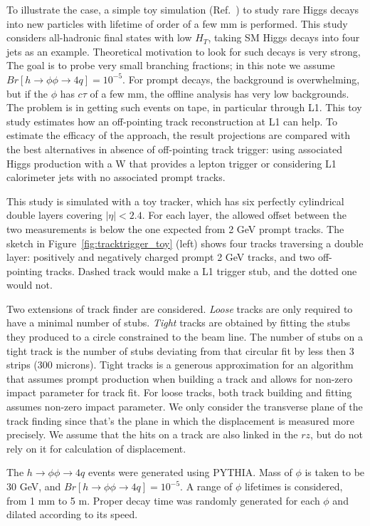To illustrate the case, a simple toy simulation (Ref.~\cite{Gershtein:2017tsv}) to study rare Higgs decays into new particles with lifetime of order of a few mm is performed. 
This study considers all-hadronic final states with low $H_T$, taking SM Higgs decays into four jets as an example.
Theoretical motivation to look for such decays is very strong, The goal is to probe very small
branching fractions; in this note we assume $Br[h\rightarrow\phi\phi\rightarrow 4q] = 10^{-5}$. 
For prompt decays, the background is overwhelming, but if the $\phi$ has $c\tau$ of a few mm, the offline analysis has very low 
backgrounds.
The problem is in getting such events on tape, in particular through L1. This toy study estimates how an off-pointing track reconstruction 
at L1 can help. To estimate the efficacy of the approach, the result projections are compared with the best alternatives in absence of off-pointing track trigger: using
associated Higgs production with a W that provides a lepton trigger or considering L1 calorimeter jets with no associated 
prompt tracks.

This study is simulated with a toy tracker, which has six perfectly cylindrical double layers \cite{geom} covering $|\eta|<2.4$. 
For each layer, the allowed offset between the two measurements
is below the one expected from 2 GeV prompt tracks. 
The sketch in Figure~\ref{fig:tracktrigger_toy} (left) shows four tracks traversing a double layer: positively and negatively charged 
prompt 2 GeV tracks, and two off-pointing tracks. Dashed track would make a L1 trigger stub, and the dotted one would not. 

Two extensions of track finder are considered. {\it Loose} tracks are only required to have a minimal number of stubs. 
{\it Tight} tracks are obtained by fitting the stubs they produced to a circle constrained to the beam line. The number of stubs on a tight track
is the number of stubs deviating from that circular fit by less then 3 strips (300 microns). Tight tracks is a generous approximation for 
an algorithm that assumes prompt production when building a track and allows for non-zero impact parameter for track fit.
For loose tracks, both track building and fitting assumes non-zero impact parameter. We only consider the transverse plane of the track finding
since that's the plane in which the displacement is measured more precisely. We assume that the hits on a track are also linked in the $rz$, but do 
not rely on it for calculation of displacement. 

The $h\rightarrow\phi\phi\rightarrow 4q$ events were generated using PYTHIA. Mass of $\phi$ is taken to be 30 GeV,
and $Br[h\rightarrow\phi\phi\rightarrow 4q]=10^{-5}$. A range of $\phi$ lifetimes is considered, from 1 mm to 5 m.
Proper decay time was randomly generated for each $\phi$ and dilated according to its speed.

